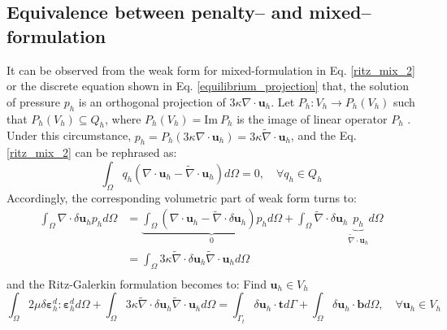 \subsection{Equivalence between penalty-- and mixed--formulation}
It can be observed from the weak form for mixed-formulation in Eq. \eqref{ritz_mix_2} or the discrete equation shown in Eq. \eqref{equilibrium_projection} that, the solution of pressure $p_h$ is an orthogonal projection of $3\kappa \nabla \cdot \boldsymbol u_h$. Let $P_h: V_h \rightarrow P_h(V_h)$ such that $P_h(V_h) \subseteq Q_h$, where $P_h(V_h) = \textrm{Im}\:P_h$ is the image of linear operator $P_h$ \cite{philippeg.2013}. Under this circumstance, $p_h = P_h (3\kappa \nabla \cdot \boldsymbol u_h) = 3\kappa \tilde \nabla \cdot \boldsymbol u_h$, and the Eq. \eqref{ritz_mix_2} can be rephrased as: 
\begin{equation}
    \int_\Omega q_h(\nabla \cdot \boldsymbol u_h - \tilde \nabla \cdot \boldsymbol u_h) d\Omega = 0, \quad \forall q_h \in Q_h
\end{equation}
Accordingly, the corresponding volumetric part of weak form turns to:
\begin{equation}\label{projection_mixed}
\begin{split}
    \int_\Omega \nabla \cdot \delta \boldsymbol u_h p_h d\Omega &= \underbrace{\int_\Omega (\nabla \cdot \boldsymbol u_h - \tilde \nabla \cdot \delta \boldsymbol u_h) p_h d\Omega}_0 + \int_\Omega \tilde \nabla \cdot \delta \boldsymbol u_h \underbrace{p_h}_{\tilde \nabla \cdot \boldsymbol u_h} d\Omega \\
    &= \int_\Omega 3\kappa \tilde \nabla \cdot \delta \boldsymbol u_h \tilde \nabla \cdot \boldsymbol u_h d\Omega \\
\end{split}
\end{equation}
and the Ritz-Galerkin formulation becomes to: Find $\boldsymbol u_h \in V_h$
\begin{equation}
\int_\Omega 2\mu \delta \boldsymbol \varepsilon^d_h : \boldsymbol \varepsilon^d_h d\Omega +
\int_\Omega 3\kappa \tilde \nabla \cdot \delta \boldsymbol u_h \tilde \nabla \cdot \boldsymbol u_h d\Omega =
\int_{\Gamma_t} \delta \boldsymbol u_h \cdot \boldsymbol t d\Gamma + \int_\Omega \delta \boldsymbol u_h \cdot \boldsymbol b d\Omega, \quad \forall \boldsymbol u_h \in V_h
\end{equation}

